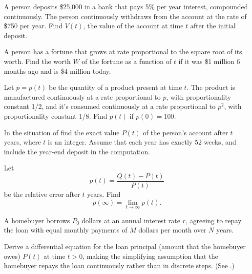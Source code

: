 \begin{exerciselist}
\item\label{exer:4.1.18}A person deposits \$25,000 in a bank that pays 5\% per
year interest, compounded continuously.  The person
continuously withdraws from the account at the rate of \$750
per year.  Find $V(t)$, the value of the account at time $t$
after the initial deposit.

\item\label{exer:4.1.19}A person has a fortune that grows at rate proportional to the
square root of its worth. Find the  worth $W$ of the fortune as a function
of $t$ if it was  \$1 million 6 months ago and
is \$4 million today.

\item\label{exer:4.1.20}Let $p=p(t)$ be the quantity of a  product present at
time $t$. The product is manufactured continuously at a
rate proportional to $p$, with proportionality constant 1/2,
and it's consumed continuously at a rate proportional to
$p^2$, with proportionality constant 1/8.  Find $p(t)$ if
$p(0)=100$.

\item\label{exer:4.1.21}\begin{alist}
\item %
 In the situation of 
find the exact value $P(t)$ of the person's account after $t$
years, where $t$ is an integer.  Assume that each year has
exactly 52 weeks, and include the year-end
deposit in the computation.


\item %
 Let
\[
p(t)=\frac{Q(t)-P(t)}{P(t)}
\]
be the relative error after $t$ years.  Find
\[
p(\infty)=\lim_{t\to\infty}p(t).
\]
\end{alist}

\item\label{exer:4.1.22}A homebuyer borrows $P_0$ dollars at an annual interest rate $r$,
agreeing to repay the loan with equal monthly payments of $M$ dollars
per month over $N$ years.
\begin{alist} \item %
Derive a
differential equation for the loan principal (amount that the
homebuyer owes) $P(t)$ at time $t>0$, making the simplifying
assumption that the homebuyer repays the loan continuously rather than
in discrete steps. (See \zcref{example:4.1.6}.)


\end{alist}
\end{exerciselist}
